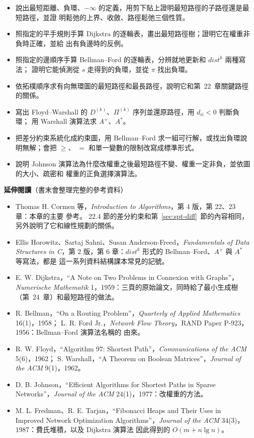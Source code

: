 \begin{itemize}
\item 說出最短距離、負環、$-\infty$ 的定義，用剪下貼上證明最短路徑的子路徑還是最短路徑，並證
明鬆弛的上界、收斂、路徑鬆弛三個性質。
\item 照指定的平手規則手算 Dijkstra 的逐輪表，畫出最短路徑樹；證明它在權重非負時正確，並給
出有負邊時的反例。
\item 照指定的邊順序手算 Bellman--Ford 的逐輪表，分辨就地更新和 $\mathit{dist}^{k}$ 兩種寫法；
證明它能偵測從 $s$ 走得到的負環，並從 $\pi$ 找出負環。
\item 依拓樸順序求有向無環圖的最短路徑和最長路徑，說明它和第~22~章關鍵路徑的關係。
\item 寫出 Floyd--Warshall 的 $D^{(k)}$、$\Pi^{(k)}$ 序列並還原路徑，用 $d_{ii} < 0$ 判斷負環；
用 Warshall 演算法求 $A^{+}$、$A^{*}$。
\item 把差分約束系統化成約束圖，用 Bellman--Ford 求一組可行解，或找出負環說明無解；會把 $\ge$、
$=$ 和單一變數的限制改寫成標準形式。
\item 說明 Johnson 演算法為什麼改權重之後最短路徑不變、權重一定非負，並依圖的大小、疏密和
權重的正負選擇演算法。
\end{itemize}

\textbf{延伸閱讀}（書末會整理完整的參考資料）

\begin{itemize}
\item Thomas H. Cormen 等，\textit{Introduction to Algorithms}，第 4 版，第 22、23 章：本章的主要
參考。 22.4 節的差分約束和第~\ref{sec:spt-diff}~節的內容相同，另外說明了它和線性規劃的關係。
\item Ellis Horowitz、Sartaj Sahni、Susan Anderson-Freed，\textit{Fundamentals of Data Structures
in C}，第 2 版，第 6 章：$\mathit{dist}^{k}$ 形式的 Bellman--Ford、$A^{+}$ 與 $A^{*}$ 等寫法，都是
這一系列資料結構課本常見的記號。
\item E. W. Dijkstra，``A Note on Two Problems in Connexion with Graphs''，\textit{Numerische
Mathematik} 1，1959：三頁的原始論文，同時給了最小生成樹（第~24~章）和最短路徑的做法。
\item R. Bellman，``On a Routing Problem''，\textit{Quarterly of Applied Mathematics} 16(1)，1958；
L. R. Ford Jr.，\textit{Network Flow Theory}，RAND Paper P-923，1956：Bellman--Ford 演算法名稱的
由來。
\item R. W. Floyd，``Algorithm 97: Shortest Path''，\textit{Communications of the ACM} 5(6)，1962；
S. Warshall，``A Theorem on Boolean Matrices''，\textit{Journal of the ACM} 9(1)，1962。
\item D. B. Johnson，``Efficient Algorithms for Shortest Paths in Sparse Networks''，\textit{Journal of
the ACM} 24(1)，1977：改權重的方法。
\item M. L. Fredman、R. E. Tarjan，``Fibonacci Heaps and Their Uses in Improved Network
Optimization Algorithms''，\textit{Journal of the ACM} 34(3)，1987：費氏堆積，以及 Dijkstra 演算法
因此得到的 $O(m + n \lg n)$。
\end{itemize}

